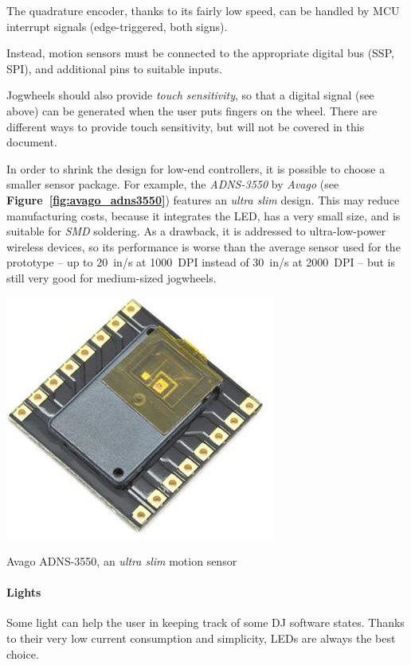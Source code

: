 \documentclass[a4paper,10pt]{article}
\makeatletter
\newenvironment{figurehere}{\def\@captype{figure}\vspace{2ex}}{\vspace{2ex}}
\newcommand{\citef}[1]{\textbf{Figure~\ref{#1}}}
\makeatother
\begin{document}
\begin{multicols}{2}
The quadrature encoder, thanks to its fairly low speed, can be handled by
MCU interrupt signals (edge-triggered, both signs).

Instead, motion sensors must be connected to the appropriate digital bus
(SSP, SPI), and additional pins to suitable inputs.

Jogwheels should also provide \emph{touch sensitivity}, so that a digital
signal (see above) can be generated when the user puts fingers on the wheel.
There are different ways to provide touch sensitivity, but will not be
covered in this document.

In order to shrink the design for low-end controllers, it is possible to
choose a smaller sensor package. For example, the \emph{ADNS-3550} by
\emph{Avago} \cite{avago_adns3550} (see \citef{fig:avago_adns3550}) features
an \emph{ultra slim} design. This may reduce manufacturing costs, because it
integrates the LED, has a very small size, and is suitable for \emph{SMD}
soldering. As a drawback, it is addressed to ultra-low-power wireless devices,
so its performance is worse than the average sensor used for the prototype --
up to 20~in/s at 1000~DPI instead of 30~in/s at 2000~DPI -- but is still
very good for medium-sized jogwheels.

\begin{figurehere}
	\centering
	\includegraphics[keepaspectratio=true,width=0.5\columnwidth]{images/avago_adns3550.jpg}
	\caption{Avago ADNS-3550, an \emph{ultra slim} motion sensor}
	\label{fig:avago_adns3550}
\end{figurehere}


\paragraph{Lights}
Some light can help the user in keeping track of some DJ software states.
Thanks to their very low current consumption and simplicity, LEDs are
always the best choice.


\end{multicols}
\end{document}
